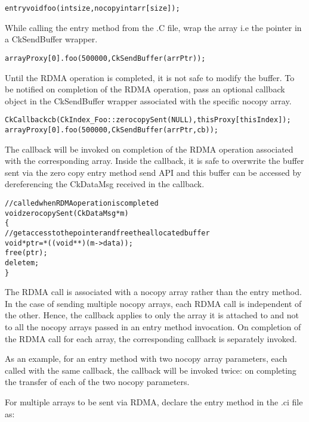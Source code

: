 \begin{alltt}
entry void foo (int size, nocopy int arr[size]);
\end{alltt}

While calling the entry method from the .C file, wrap the array i.e the
pointer in a CkSendBuffer wrapper.

\begin{alltt}
arrayProxy[0].foo(500000, CkSendBuffer(arrPtr));
\end{alltt}

Until the RDMA operation is completed, it is not safe to modify the buffer.
To be notified on completion of the RDMA operation, pass an optional callback object
in the CkSendBuffer wrapper associated with the specific nocopy array.

\begin{alltt}
CkCallback cb(CkIndex_Foo::zerocopySent(NULL), thisProxy[thisIndex]);
arrayProxy[0].foo(500000, CkSendBuffer(arrPtr, cb));
\end{alltt}

The callback will be invoked on completion of the RDMA operation associated with the
corresponding array. Inside the callback, it is safe to overwrite the buffer sent
via the zero copy entry method send API and this buffer can be accessed by dereferencing
the CkDataMsg received in the callback.

\begin{alltt}
//called when RDMA operation is completed
void zerocopySent(CkDataMsg *m)
\{
  //get access to the pointer and free the allocated buffer
  void *ptr = *((void **)(m->data));
  free(ptr);
  delete m;
\}
\end{alltt}

The RDMA call is associated with a nocopy array rather than the entry method.
In the case of sending multiple nocopy arrays, each RDMA call is independent of the other.
Hence, the callback applies to only the array it is attached to and not to all the nocopy
arrays passed in an entry method invocation. On completion of the RDMA call for each
array, the corresponding callback is separately invoked.

As an example, for an entry method with two nocopy array parameters, each called with the same
callback, the callback will be invoked twice: on completing the transfer of each of the two
nocopy parameters.

\vspace{0.1in}
\noindent
For multiple arrays to be sent via RDMA, declare the entry method in the .ci file as:

